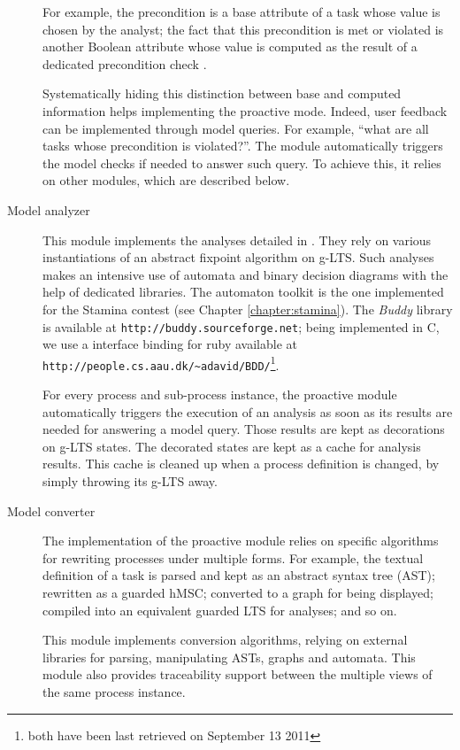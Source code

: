 \begin{description}
For example, the precondition is a base attribute of a task whose value is chosen by the analyst; the fact that this precondition is met or violated is another Boolean attribute whose value is computed as the result of a dedicated precondition check \cite{Damas:2011}. 

Systematically hiding this distinction between base and computed information helps implementing the proactive mode. Indeed, user feedback can be implemented through model queries. For example, ``what are all tasks whose precondition is violated?''. The module automatically triggers the model checks if needed to answer such query. To achieve this, it relies on other modules, which are described below.

\item[Model analyzer] This module implements the analyses detailed in \cite{Damas:2011}. They rely on various instantiations of an abstract fixpoint algorithm on g-LTS. Such analyses makes an intensive use of automata and binary decision diagrams with the help of dedicated libraries. The automaton toolkit is the one implemented for the Stamina contest (see Chapter \ref{chapter:stamina}). The \emph{Buddy} library is available at \verb|http://buddy.sourceforge.net|; being implemented in C, we use a interface binding for ruby available at \verb|http://people.cs.aau.dk/~adavid/BDD/|\footnote{both have been last retrieved on September 13 2011}.

For every process and sub-process instance, the proactive module automatically triggers the execution of an analysis as soon as its results are needed for answering a model query. Those results are kept as decorations on g-LTS states. The decorated states are kept as a cache for analysis results. This cache is cleaned up when a process definition is changed, by simply throwing its g-LTS away.

\item[Model converter] The implementation of the proactive module relies on specific algorithms for rewriting processes under multiple forms. For example, the textual definition of a task is parsed and kept as an abstract syntax tree (AST); rewritten as a guarded hMSC; converted to a graph for being displayed; compiled into an equivalent guarded LTS for analyses; and so on. 

This module implements conversion algorithms, relying on external libraries for parsing, manipulating ASTs, graphs and automata. This module also provides traceability support between the multiple views of the same process instance.
\end{description}

